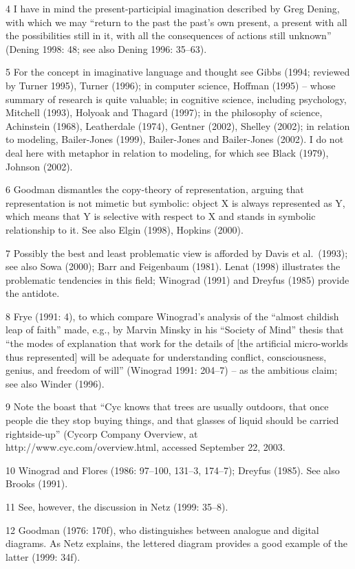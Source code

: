 4 I have in mind the present-participial imagination described by Greg
Dening, with which we may ``return to the past the past's own present, a
present with all the possibilities still in it, with all the
consequences of actions still unknown'' (Dening 1998: 48; see also
Dening 1996: 35--63).

5 For the concept in imaginative language and thought see Gibbs (1994;
reviewed by Turner 1995), Turner (1996); in computer science, Hoffman
(1995) -- whose summary of research is quite valuable; in cognitive
science, including psychology, Mitchell (1993), Holyoak and Thagard
(1997); in the philosophy of science, Achinstein (1968), Leatherdale
(1974), Gentner (2002), Shelley (2002); in relation to modeling,
Bailer-Jones (1999), Bailer-Jones and Bailer-Jones (2002). I do not deal
here with metaphor in relation to modeling, for which see Black (1979),
Johnson (2002).

6 Goodman dismantles the copy-theory of representation, arguing that
representation is not mimetic but symbolic: object X is always
represented as Y, which means that Y is selective with respect to X and
stands in symbolic relationship to it. See also Elgin (1998), Hopkins
(2000).

7 Possibly the best and least problematic view is afforded by Davis et
al.~(1993); see also Sowa (2000); Barr and Feigenbaum (1981). Lenat
(1998) illustrates the problematic tendencies in this field; Winograd
(1991) and Dreyfus (1985) provide the antidote.

8 Frye (1991: 4), to which compare Winograd's analysis of the ``almost
childish leap of faith'' made, e.g., by Marvin Minsky in his ``Society
of Mind'' thesis that ``the modes of explanation that work for the
details of {[}the artificial micro-worlds thus represented{]} will be
adequate for understanding conflict, consciousness, genius, and freedom
of will'' (Winograd 1991: 204--7) -- as the ambitious claim; see also
Winder (1996).

9 Note the boast that ``Cyc knows that trees are usually outdoors, that
once people die they stop buying things, and that glasses of liquid
should be carried rightside-up'' (Cycorp Company Overview, at
http://www.cyc.com/overview.html, accessed September 22, 2003.

10 Winograd and Flores (1986: 97--100, 131--3, 174--7); Dreyfus (1985).
See also Brooks (1991).

11 See, however, the discussion in Netz (1999: 35--8).

12 Goodman (1976: 170f), who distinguishes between analogue and digital
diagrams. As Netz explains, the lettered diagram provides a good example
of the latter (1999: 34f).

